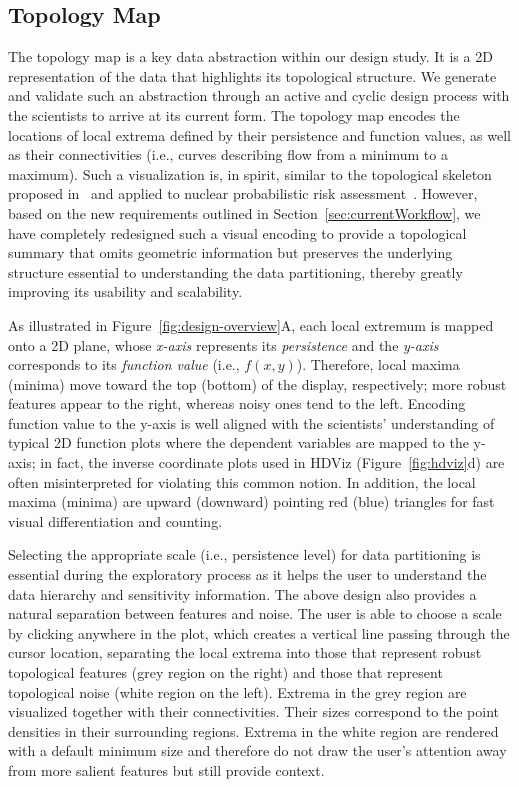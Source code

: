 \subsection{Topology Map}
\label{sec:topologyMap}
The topology map is a key data abstraction within our design study.
%
It is a 2D representation of the data that highlights its topological structure.
%
We generate and validate such an abstraction through an active and cyclic design process with the scientists to arrive at its current form.
%
The topology map encodes the locations of local extrema defined by their persistence and function values, as well as their connectivities (i.e., curves describing flow from a minimum to a maximum).
%
Such a visualization is, in spirit, similar to the topological skeleton proposed in~\cite{GerberBremerPascucci2010} and applied to nuclear probabilistic risk assessment~\cite{MaljovecWangMandelli2013a,MaljovecWangPascucci2013}.
%
However, based on the new requirements outlined in Section~\ref{sec:currentWorkflow}, we have completely redesigned such a visual encoding to provide a topological summary that omits geometric information but  preserves the underlying structure essential to understanding the data partitioning, thereby greatly improving its usability and scalability.

As illustrated in Figure~\ref{fig:design-overview}A, each local extremum is mapped onto a 2D plane, whose \emph{x-axis} represents its \emph{persistence} and the \emph{y-axis} corresponds to its \emph{function value} (i.e., $f(x,y)$).
%
Therefore, local maxima (minima) move toward the top (bottom) of the display, respectively; more robust features appear to the right, whereas noisy ones tend to the left.
%
Encoding function value to the y-axis is well aligned with the scientists' understanding of typical 2D function plots where the dependent variables are mapped to the y-axis; in fact, the inverse coordinate plots used in HDViz (Figure~\ref{fig:hdviz}d) are often misinterpreted for violating this common notion.
%
In addition, the local maxima (minima) are upward (downward) pointing red (blue)  triangles for fast visual differentiation and counting.

Selecting the appropriate scale (i.e., persistence level) for data partitioning is essential during the exploratory process as it helps the user to understand the data hierarchy and sensitivity information.
%
The above design also provides a natural separation between features and noise.
%
The user is able to choose a scale by clicking anywhere in the plot, which creates a vertical line passing through the cursor location, separating the local extrema into those that represent robust topological features (grey region on the right) and those that represent topological noise (white region on the left).
%
Extrema in the grey region are visualized together with their connectivities.
%
Their sizes correspond to the point densities in their surrounding regions.
%
Extrema in the white region are rendered with a default minimum size and therefore do not draw the user's attention away from more salient features but still provide context.

